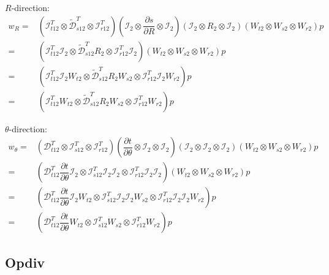 \documentclass{kthreport}
\begin{document}
$R$-direction:
\begin{subequations}
	\begin{eqnarray}
		w_{R}	=& (\mathcal{I}^{T}_{t12}\otimes\widetilde{\mathcal{D}}^{T}_{s12}\otimes\mathcal{I}^{T}_{r12})(\mathcal{I}_{2}\otimes\dfrac{\partial s}{\partial R}\otimes\mathcal{I}_{2})(\mathcal{I}_{2}\otimes R_{2}\otimes\mathcal{I}_{2})(W_{t2}\otimes W_{s2}\otimes W_{r2})p \\
	  	=& (\mathcal{I}^{T}_{t12}\mathcal{I}_{2}\otimes\widetilde{\mathcal{D}}^{T}_{s12}R_{2}\otimes\mathcal{I}^{T}_{r12}\mathcal{I}_{2})(W_{t2}\otimes W_{s2}\otimes W_{r2})p \\
		=& (\mathcal{I}^{T}_{t12}\mathcal{I}_{2}W_{t2}\otimes\widetilde{\mathcal{D}}^{T}_{s12}R_{2}W_{s2}\otimes\mathcal{I}^{T}_{r12}\mathcal{I}_{2}W_{r2})p \\
		=& (\mathcal{I}^{T}_{t12}W_{t2}\otimes\widetilde{\mathcal{D}}^{T}_{s12}R_{2}W_{s2}\otimes\mathcal{I}^{T}_{r12}W_{r2})p		
	\end{eqnarray}
\end{subequations}

$\theta$-direction:
\begin{subequations}
	\begin{eqnarray}
		w_{\theta}	=& (\mathcal{D}^{T}_{t12}\otimes\mathcal{I}^{T}_{s12}\otimes\mathcal{I}^{T}_{r12})(\dfrac{\partial t}{\partial \theta}\otimes\mathcal{I}_{2}\otimes\mathcal{I}_{2})(\mathcal{I}_{2}\otimes \mathcal{I}_{2}\otimes\mathcal{I}_{2})(W_{t2}\otimes W_{s2}\otimes W_{r2})p \\
		=& (\mathcal{D}^{T}_{t12}\dfrac{\partial t}{\partial \theta}\mathcal{I}_{2}\otimes\mathcal{I}^{T}_{s12}\mathcal{I}_{2}\mathcal{I}_{2}\otimes\mathcal{I}^{T}_{r12}\mathcal{I}_{2}\mathcal{I}_{2})(W_{t2}\otimes W_{s2}\otimes W_{r2})p \\
		=& (\mathcal{D}^{T}_{t12}\dfrac{\partial t}{\partial \theta}\mathcal{I}_{2}W_{t2}\otimes\mathcal{I}^{T}_{s12}\mathcal{I}_{2}\mathcal{I}_{2}W_{s2}\otimes\mathcal{I}^{T}_{r12}\mathcal{I}_{2}\mathcal{I}_{2}W_{r2})p \\
		=& (\mathcal{D}^{T}_{t12}\dfrac{\partial t}{\partial \theta}W_{t2}\otimes\mathcal{I}^{T}_{s12}W_{s2}\otimes\mathcal{I}^{T}_{r12}W_{r2})p
	\end{eqnarray}
\end{subequations}

\subsection{Opdiv}
\end{document}

